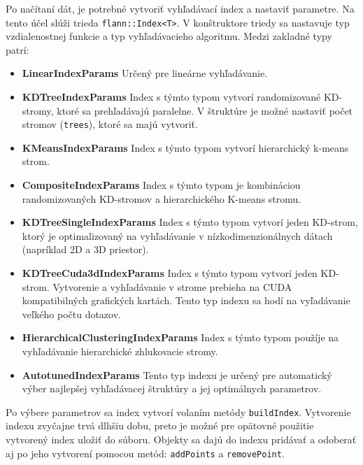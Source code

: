 \documentclass[12pt,a4paper,oneside]{fithesis2}
\begin{document}
	Po načítaní dát, je potrebné vytvoriť vyhľadávací index a nastaviť parametre. Na tento účel slúži trieda \texttt{flann::Index<T>}. V konštruktore triedy sa nastavuje typ vzdialenostnej funkcie a typ vyhľadávacieho algoritmu. Medzi zakladné typy patrí:
	\begin{itemize}
	\item \textbf{LinearIndexParams} Určený pre lineárne vyhľadávanie.
	
	\item \textbf{KDTreeIndexParams} Index s týmto typom vytvorí randomizované KD-stromy, ktoré sa prehľadávajú paralelne. V štruktúre je možné nastaviť počet stromov (\texttt{trees}), ktoré sa majú vytvoriť. 

	\item \textbf{KMeansIndexParams} Index s týmto typom vytvorí hierarchický k-means strom.

	\item \textbf{CompositeIndexParams} Index s týmto typom je kombináciou randomizovaných KD-stromov a hierarchického K-means stromu. 

	\item \textbf{KDTreeSingleIndexParams} Index s týmto typom vytvorí jeden KD-strom, ktorý je optimalizovaný na vyhľadávanie v nízkodimenzionálnych dátach (napríklad 2D a 3D priestor).

	\item \textbf{KDTreeCuda3dIndexParams} Index s týmto typom vytvorí jeden KD-strom. Vytvorenie a vyhľadávanie v strome prebieha na CUDA kompatibilných grafických kartách. Tento typ indexu sa hodí na vyľadávanie veľkého počtu dotazov.
	
	\item \textbf{HierarchicalClusteringIndexParams} Index s týmto typom použíje na vyhľadávanie hierarchické zhlukovacie stromy.

	\item \textbf{AutotunedIndexParams} Tento typ indexu je určený pre automatický výber najlepšej vyhľadávacej štruktúry a jej optimálnych parametrov.
	
	\end{itemize}

Po výbere parametrov sa index vytvorí volaním metódy \texttt{buildIndex}. Vytvorenie indexu zvyčajne trvá dlhšiu dobu, preto je možné pre opätovné použitie vytvorený index uložiť do súboru.
Objekty sa dajú do indexu pridávať a odoberať aj po jeho vytvorení pomocou metód: \texttt{addPoints} a \texttt{removePoint}. 
\end{document}
